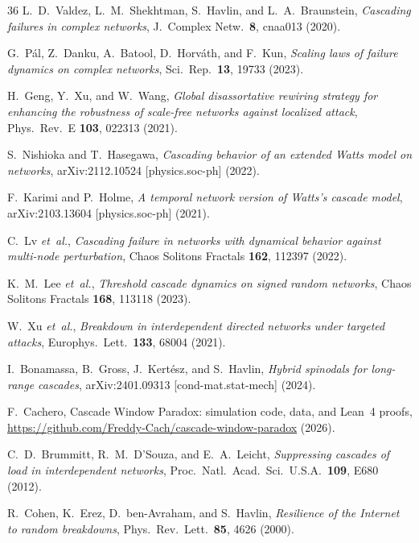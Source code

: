 \documentclass[aps,pre,twocolumn,superscriptaddress,showpacs]{revtex4-2}
\begin{document}
\begin{thebibliography}{36}
L.~D.~Valdez, L.~M.~Shekhtman, S.~Havlin, and L.~A.~Braunstein,
\emph{Cascading failures in complex networks},
J.\ Complex Netw.\ \textbf{8}, cnaa013 (2020).

G.~P\'al, Z.~Danku, A.~Batool, D.~Horv\'ath, and F.~Kun,
\emph{Scaling laws of failure dynamics on complex networks},
Sci.\ Rep.\ \textbf{13}, 19733 (2023).

H.~Geng, Y.~Xu, and W.~Wang,
\emph{Global disassortative rewiring strategy for enhancing the robustness of scale-free networks against localized attack},
Phys.\ Rev.\ E \textbf{103}, 022313 (2021).

S.~Nishioka and T.~Hasegawa,
\emph{Cascading behavior of an extended Watts model on networks},
arXiv:2112.10524 [physics.soc-ph] (2022).

F.~Karimi and P.~Holme,
\emph{A temporal network version of Watts's cascade model},
arXiv:2103.13604 [physics.soc-ph] (2021).

C.~Lv \emph{et~al.},
\emph{Cascading failure in networks with dynamical behavior against multi-node perturbation},
Chaos Solitons Fractals \textbf{162}, 112397 (2022).

K.~M.~Lee \emph{et~al.},
\emph{Threshold cascade dynamics on signed random networks},
Chaos Solitons Fractals \textbf{168}, 113118 (2023).

W.~Xu \emph{et~al.},
\emph{Breakdown in interdependent directed networks under targeted attacks},
Europhys.\ Lett.\ \textbf{133}, 68004 (2021).

I.~Bonamassa, B.~Gross, J.~Kert\'esz, and S.~Havlin,
\emph{Hybrid spinodals for long-range cascades},
arXiv:2401.09313 [cond-mat.stat-mech] (2024).

F.~Cachero,
Cascade Window Paradox: simulation code, data, and Lean~4 proofs,
\url{https://github.com/Freddy-Cach/cascade-window-paradox} (2026).

C.~D.~Brummitt, R.~M.~D'Souza, and E.~A.~Leicht,
\emph{Suppressing cascades of load in interdependent networks},
Proc.\ Natl.\ Acad.\ Sci.\ U.S.A.\ \textbf{109}, E680 (2012).

R.~Cohen, K.~Erez, D.~ben-Avraham, and S.~Havlin,
\emph{Resilience of the Internet to random breakdowns},
Phys.\ Rev.\ Lett.\ \textbf{85}, 4626 (2000).

\end{thebibliography}
\end{document}
